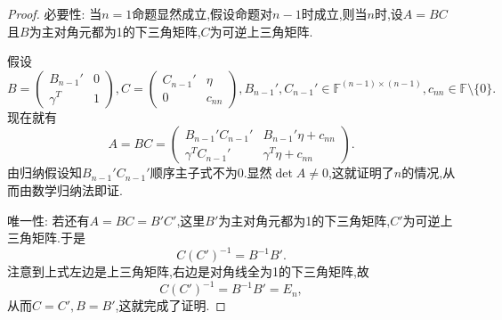 \documentclass[../../main.tex]{subfiles}%
\begin{document}
\begin{proof}
{\heiti 必要性:} 当\(n = 1\)命题显然成立,假设命题对\(n - 1\)时成立,则当\(n\)时,设\(A = BC\)且\(B\)为主对角元都为1的下三角矩阵,\(C\)为可逆上三角矩阵.

假设
\[
B = \begin{pmatrix}
B_{n - 1}' & 0 \\
\gamma^T & 1
\end{pmatrix}, C = \begin{pmatrix}
C_{n - 1}' & \eta \\
0 & c_{nn}
\end{pmatrix}, B_{n - 1}', C_{n - 1}' \in \mathbb{F}^{(n - 1) \times (n - 1)}, c_{nn} \in \mathbb{F} \setminus \{0\}.
\]
现在就有
\[
A = BC = \begin{pmatrix}
B_{n - 1}' C_{n - 1}' & B_{n - 1}' \eta + c_{nn} \\
\gamma^T C_{n - 1}' & \gamma^T \eta + c_{nn}
\end{pmatrix}.
\]
由归纳假设知\(B_{n - 1}' C_{n - 1}'\)顺序主子式不为0.显然\(\det A \neq 0\),这就证明了\(n\)的情况,从而由数学归纳法即证.

{\heiti 唯一性:} 若还有\(A = BC = B'C'\),这里\(B'\)为主对角元都为1的下三角矩阵,\(C'\)为可逆上三角矩阵.于是
\[
C (C')^{-1} = B^{-1} B'.
\]
注意到上式左边是上三角矩阵,右边是对角线全为1的下三角矩阵,故
\[
C (C')^{-1} = B^{-1} B' = E_n,
\]
从而\(C = C', B = B'\),这就完成了证明.

\end{proof}
\end{document}
